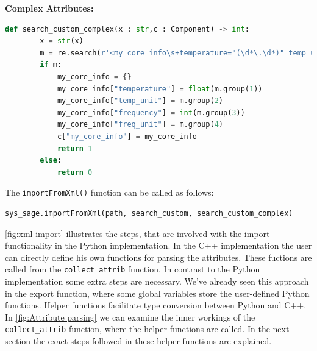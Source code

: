 \textbf{Complex Attributes:}
    \begin{lstlisting}[language=Python, xleftmargin=4em, frame = single]
    def search_custom_complex(x : str,c : Component) -> int:
        x = str(x)
        m = re.search(r'<my_core_info\s+temperature="(\d*\.\d*)" temp_unit="(\w*)" frequency="(\d*)" freq_unit="(\w*)"/>', x)
        if m:
            my_core_info = {}
            my_core_info["temperature"] = float(m.group(1))
            my_core_info["temp_unit"] = m.group(2)
            my_core_info["frequency"] = int(m.group(3))
            my_core_info["freq_unit"] = m.group(4)
            c["my_core_info"] = my_core_info
            return 1
        else:
            return 0
    \end{lstlisting}

The \verb|importFromXml()| function can be called as follows:

\begin{lstlisting}[language=Python, xleftmargin=4em, frame = single]
sys_sage.importFromXml(path, search_custom, search_custom_complex)
\end{lstlisting}


\autoref{fig:xml-import} illustrates the steps, that are involved with the import functionality in the Python implementation. In the C++ implementation the user can directly define his own functions for parsing the attributes. These fuctions are called from the \verb|collect_attrib| function. In contrast to the Python implementation some extra steps are necessary.
We've already seen this approach in the export function,  where some global variables store the user-defined Python functions. Helper functions facilitate type conversion between Python and C++. In \autoref{fig:Attribute parsing} we can examine the inner workings of the \verb|collect_attrib| function, where the helper functions are called. In the next section the exact steps followed in these helper functions are explained.

